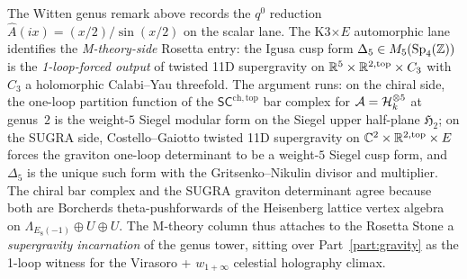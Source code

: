 \begin{remark}
\label{rem:rosetta-Delta5-11D-SUGRA}
%
%
%
The Witten genus remark above records the $q^0$ reduction
$\hat{A}(ix) = (x/2)/\sin(x/2)$ on the scalar lane. The K3$\times E$ automorphic lane identifies
the \emph{M-theory-side} Rosetta entry: the Igusa cusp form
$\Delta_5 \in M_5(\mathrm{Sp}_4(\mathbb{Z}))$ is the \emph{1-loop-forced
output} of twisted 11D supergravity on
$\mathbb{R}^5 \times \mathbb{R}^{2,\mathrm{top}} \times C_3$ with $C_3$ a holomorphic
Calabi--Yau threefold. The argument runs: on the chiral side, the
one-loop partition function of the $\mathsf{SC}^{\mathrm{ch,top}}$
bar complex for $\mathcal{A} = \mathcal{H}_k^{\otimes 5}$ at genus~$2$ is the weight-$5$
Siegel modular form on the Siegel upper half-plane $\mathfrak{H}_2$;
on the SUGRA side, Costello--Gaiotto twisted 11D supergravity on
$\mathbb{C}^2 \times \mathbb{R}^{2,\mathrm{top}} \times E$ forces the graviton
one-loop determinant to be a weight-$5$ Siegel cusp form, and
$\Delta_5$ is the unique such form with the Gritsenko--Nikulin
divisor and multiplier. The chiral bar
complex and the SUGRA graviton determinant agree because both are
Borcherds theta-pushforwards of the Heisenberg lattice vertex algebra
on $\Lambda_{E_8(-1)} \oplus U \oplus U$. The M-theory column
thus attaches to the Rosetta Stone a \emph{supergravity incarnation}
of the genus tower, sitting over Part~\ref{part:gravity} as the
1-loop witness for the Virasoro + $w_{1+\infty}$ celestial
holography climax.
\end{remark}

